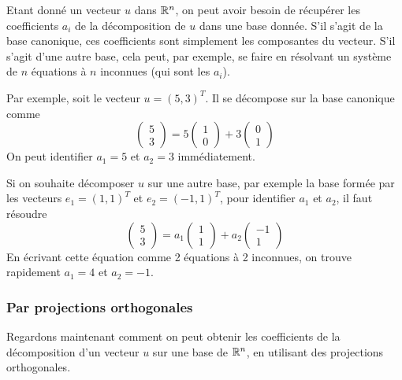 Etant donné un vecteur $u$ dans $\mathbb{R}^n$, on peut avoir besoin de récupérer les coefficients $a_i$ de la décomposition de $u$ dans une base donnée.
 S'il s'agit de la base canonique, ces coefficients sont simplement les composantes du vecteur. S'il s'agit d'une autre base, cela peut, par exemple, se faire en résolvant un système de $n$ équations à $n$ inconnues (qui sont les $a_i$).

Par exemple, soit le vecteur $u=(5,3)^T$. Il se décompose sur la base canonique comme  
\begin{equation}
\begin{pmatrix} 5 \\ 3 \end{pmatrix} = 5  \begin{pmatrix} 1 \\ 0 \end{pmatrix} + 3  \begin{pmatrix} 0 \\ 1 \end{pmatrix}
\end{equation}
On peut identifier $a_1=5$ et $a_2=3$ immédiatement.

Si on souhaite décomposer $u$ sur une autre base, par exemple la base formée par les vecteurs $e_1=(1,1)^T$ et $e_2=(-1,1)^T$, pour identifier $a_1$ et $a_2$, il faut résoudre
\begin{equation}
\begin{pmatrix} 5 \\ 3 \end{pmatrix}  = a_1  \begin{pmatrix} 1 \\ 1 \end{pmatrix} + a_2  \begin{pmatrix} -1 \\ 1 \end{pmatrix}
\end{equation}
En écrivant cette équation comme 2 équations à 2 inconnues, on trouve rapidement $a_1=4$ et $a_2=-1$.

\subsubsection{Par projections orthogonales}

Regardons maintenant comment on peut obtenir les coefficients de la décomposition d'un vecteur $u$ sur une base de $\mathbb{R}^n$, en utilisant des projections orthogonales. 

